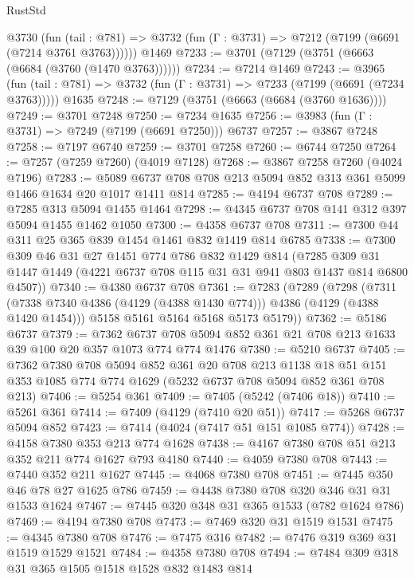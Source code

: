 \begin{lexlean}{RustStd}
\begin{coremodule}
    @3730
      (fun (tail : @781) => @3732 (fun (Γ : @3731) => @7212 (@7199 (@6691 (@7214 @3761 @3763))))))
    @1469
@7233 := @3701 (@7129 (@3751 (@6663 (@6684 (@3760 (@1470 @3763))))))
@7234 := @7214 @1469
@7243 := @3965
    (fun (tail : @781) => @3732 (fun (Γ : @3731) => @7233 (@7199 (@6691 (@7234 @3763)))))
    @1635
@7248 := @7129 (@3751 (@6663 (@6684 (@3760 @1636))))
@7249 := @3701 @7248
@7250 := @7234 @1635
@7256 := @3983 (fun (Γ : @3731) => @7249 (@7199 (@6691 @7250))) @6737
@7257 := @3867 @7248
@7258 := @7197 @6740
@7259 := @3701 @7258
@7260 := @6744 @7250
@7264 := @7257 (@7259 @7260) (@4019 @7128)
@7268 := @3867 @7258 @7260 (@4024 @7196)
@7283 := @5089 @6737 @708 @708 @213 @5094 @852 @313 @361 @5099 @1466 @1634 @20 @1017 @1411 @814
@7285 := @4194 @6737 @708
@7289 := @7285 @313 @5094 @1455 @1464
@7298 := @4345 @6737 @708 @141 @312 @397 @5094 @1455 @1462 @1050
@7300 := @4358 @6737 @708
@7311 := @7300 @44 @311 @25 @365 @839 @1454 @1461 @832 @1419 @814 @6785
@7338 := @7300
    @309
    @46
    @31
    @27
    @1451
    @774
    @786
    @832
    @1429
    @814
    (@7285 @309 @31 @1447 @1449 (@4221 @6737 @708 @115 @31 @31 @941 @803 @1437 @814 @6800 @4507))
@7340 := @4380 @6737 @708
@7361 := @7283
    (@7289
      (@7298
        (@7311 (@7338 @7340 @4386 (@4129 (@4388 @1430 @774))) @4386 (@4129 (@4388 @1420 @1454)))
        @5158
        @5161
        @5164
        @5168
        @5173
        @5179))
@7362 := @5186 @6737
@7379 := @7362
    @6737
    @708
    @5094
    @852
    @361
    @21
    @708
    @213
    @1633
    @39
    @100
    @20
    @357
    @1073
    @774
    @774
    @1476
@7380 := @5210 @6737
@7405 := @7362
    @7380
    @708
    @5094
    @852
    @361
    @20
    @708
    @213
    @1138
    @18
    @51
    @151
    @353
    @1085
    @774
    @774
    @1629
    (@5232 @6737 @708 @5094 @852 @361 @708 @213)
@7406 := @5254 @361
@7409 := @7405 (@5242 (@7406 @18))
@7410 := @5261 @361
@7414 := @7409 (@4129 (@7410 @20 @51))
@7417 := @5268 @6737 @5094 @852
@7423 := @7414 (@4024 (@7417 @51 @151 @1085 @774))
@7428 := @4158 @7380 @353 @213 @774 @1628
@7438 := @4167 @7380 @708 @51 @213 @352 @211 @774 @1627 @793 @4180
@7440 := @4059 @7380 @708
@7443 := @7440 @352 @211 @1627
@7445 := @4068 @7380 @708
@7451 := @7445 @350 @46 @78 @27 @1625 @786
@7459 := @4438 @7380 @708 @320 @346 @31 @31 @1533 @1624
@7467 := @7445 @320 @348 @31 @365 @1533 (@782 @1624 @786)
@7469 := @4194 @7380 @708
@7473 := @7469 @320 @31 @1519 @1531
@7475 := @4345 @7380 @708
@7476 := @7475 @316
@7482 := @7476 @319 @369 @31 @1519 @1529 @1521
@7484 := @4358 @7380 @708
@7494 := @7484 @309 @318 @31 @365 @1505 @1518 @1528 @832 @1483 @814

\end{coremodule}
\end{lexlean}

